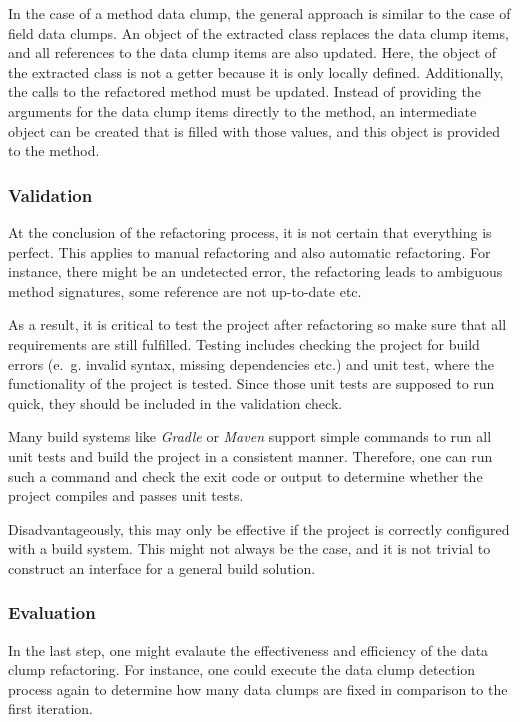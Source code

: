 In the case of a method data clump, the general approach is similar to the case of field data clumps. An object of the extracted class replaces the data clump items, and all references to the data clump items are also updated. Here, the object of the extracted class is not a getter because it is only locally defined. Additionally, the calls to the refactored method must be updated. Instead of providing the arguments for the data clump items directly to the method, an intermediate object can be created that is filled with those values, and this object is provided to the method. 

\subsubsection{Validation}

At the conclusion of the refactoring process, it is not certain that everything is perfect. This applies to manual refactoring and also automatic refactoring. For instance, there might be an undetected error, the refactoring leads to ambiguous method signatures, some reference are not up-to-date etc.

As a result, it is critical to test the project after refactoring so make sure that all requirements are still fulfilled. Testing includes checking the project for build errors (e.~g. invalid syntax, missing dependencies etc.) and unit test, where the functionality of the project is tested. Since those unit tests are supposed to run quick, they should be included in the validation check. 

Many build systems like \textit{Gradle} or \textit{Maven} support simple commands to run all unit tests and build the project in a consistent manner.  Therefore, one can run such a command and check the exit code or output to determine whether the project compiles and passes unit tests.

Disadvantageously, this may only be effective if the project is correctly configured with a build system. This might not always be the case, and it is not trivial to construct an interface for a general build solution. 

\subsubsection{Evaluation}

In the last step, one might evalaute the effectiveness and efficiency  of the data clump refactoring. For instance, one could execute the data clump detection process again to determine how many data clumps are fixed in comparison to the first iteration. 

